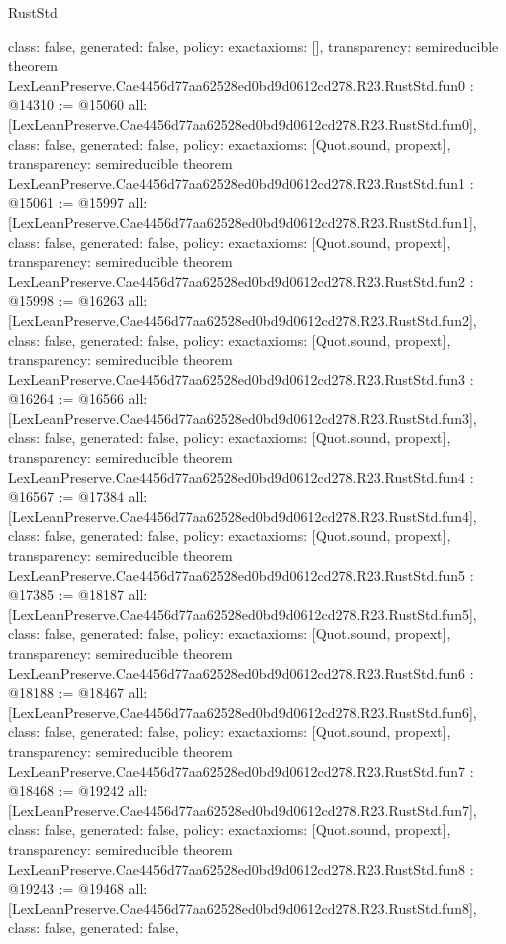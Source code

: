 \begin{lexlean}{RustStd}
\begin{coremodule}
{  class: false,
  generated: false,
  policy: exact{axioms: []},
  transparency: semireducible
}
theorem LexLeanPreserve.Cae4456d77aa62528ed0bd9d0612cd278.R23.RustStd.fun0 : @14310 := @15060 {
  all: [LexLeanPreserve.Cae4456d77aa62528ed0bd9d0612cd278.R23.RustStd.fun0],
  class: false,
  generated: false,
  policy: exact{axioms: [Quot.sound, propext]},
  transparency: semireducible
}
theorem LexLeanPreserve.Cae4456d77aa62528ed0bd9d0612cd278.R23.RustStd.fun1 : @15061 := @15997 {
  all: [LexLeanPreserve.Cae4456d77aa62528ed0bd9d0612cd278.R23.RustStd.fun1],
  class: false,
  generated: false,
  policy: exact{axioms: [Quot.sound, propext]},
  transparency: semireducible
}
theorem LexLeanPreserve.Cae4456d77aa62528ed0bd9d0612cd278.R23.RustStd.fun2 : @15998 := @16263 {
  all: [LexLeanPreserve.Cae4456d77aa62528ed0bd9d0612cd278.R23.RustStd.fun2],
  class: false,
  generated: false,
  policy: exact{axioms: [Quot.sound, propext]},
  transparency: semireducible
}
theorem LexLeanPreserve.Cae4456d77aa62528ed0bd9d0612cd278.R23.RustStd.fun3 : @16264 := @16566 {
  all: [LexLeanPreserve.Cae4456d77aa62528ed0bd9d0612cd278.R23.RustStd.fun3],
  class: false,
  generated: false,
  policy: exact{axioms: [Quot.sound, propext]},
  transparency: semireducible
}
theorem LexLeanPreserve.Cae4456d77aa62528ed0bd9d0612cd278.R23.RustStd.fun4 : @16567 := @17384 {
  all: [LexLeanPreserve.Cae4456d77aa62528ed0bd9d0612cd278.R23.RustStd.fun4],
  class: false,
  generated: false,
  policy: exact{axioms: [Quot.sound, propext]},
  transparency: semireducible
}
theorem LexLeanPreserve.Cae4456d77aa62528ed0bd9d0612cd278.R23.RustStd.fun5 : @17385 := @18187 {
  all: [LexLeanPreserve.Cae4456d77aa62528ed0bd9d0612cd278.R23.RustStd.fun5],
  class: false,
  generated: false,
  policy: exact{axioms: [Quot.sound, propext]},
  transparency: semireducible
}
theorem LexLeanPreserve.Cae4456d77aa62528ed0bd9d0612cd278.R23.RustStd.fun6 : @18188 := @18467 {
  all: [LexLeanPreserve.Cae4456d77aa62528ed0bd9d0612cd278.R23.RustStd.fun6],
  class: false,
  generated: false,
  policy: exact{axioms: [Quot.sound, propext]},
  transparency: semireducible
}
theorem LexLeanPreserve.Cae4456d77aa62528ed0bd9d0612cd278.R23.RustStd.fun7 : @18468 := @19242 {
  all: [LexLeanPreserve.Cae4456d77aa62528ed0bd9d0612cd278.R23.RustStd.fun7],
  class: false,
  generated: false,
  policy: exact{axioms: [Quot.sound, propext]},
  transparency: semireducible
}
theorem LexLeanPreserve.Cae4456d77aa62528ed0bd9d0612cd278.R23.RustStd.fun8 : @19243 := @19468 {
  all: [LexLeanPreserve.Cae4456d77aa62528ed0bd9d0612cd278.R23.RustStd.fun8],
  class: false,
  generated: false,
}
\end{coremodule}
\end{lexlean}
